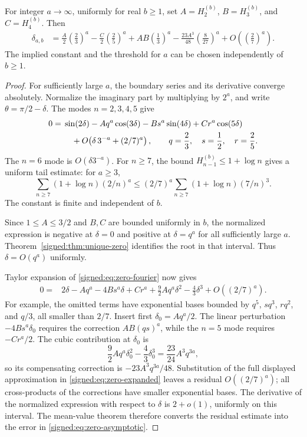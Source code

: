 \begin{theorem}\label{signed:thm:zero-asymptotic}
For integer $a\to\infty$, uniformly for real $b\ge1$, set
$A=H_2^{(b)}$, $B=H_3^{(b)}$, and $C=H_4^{(b)}$. Then
\begin{align}\label{signed:eq:zero-asymptotic}
 \delta_{a,b}
 &=\frac A2\left(\frac23\right)^a
   -\frac C2\left(\frac25\right)^a
   +AB\left(\frac13\right)^a
   -\frac{23A^3}{48}\left(\frac8{27}\right)^a
   +O\!\left(\left(\frac27\right)^a\right).
\end{align}
The implied constant and the threshold for $a$ can be chosen independently of $b\ge1$.
\end{theorem}
\begin{proof}
For sufficiently large $a$, the boundary series and its derivative converge absolutely. Normalize the imaginary part by multiplying by $2^a$, and write $\theta=\pi/2-\delta$. The modes $n=2,3,4,5$ give
\begin{align}\label{signed:eq:zero-fourier}
 0={}&\sin(2\delta)-Aq^a\cos(3\delta)-Bs^a\sin(4\delta)
       +Cr^a\cos(5\delta)\notag\\
    &\quad+O\!\left(\delta\,3^{-a}+(2/7)^a\right),
 \qquad q=\frac23,\quad s=\frac12,\quad r=\frac25.
\end{align}
The $n=6$ mode is $O(\delta3^{-a})$. For $n\ge7$, the bound
$H_{n-1}^{(b)}\le1+\log n$ gives a uniform tail estimate: for $a\ge3$,
\[
 \sum_{n\ge7}(1+\log n)(2/n)^a
 \le (2/7)^a\sum_{n\ge7}(1+\log n)(7/n)^3.
\]
The constant is finite and independent of $b$.

Since $1\le A\le3/2$ and $B,C$ are bounded uniformly in $b$, the normalized expression is negative at $\delta=0$ and positive at $\delta=q^a$ for all sufficiently large $a$. Theorem~\ref{signed:thm:unique-zero} identifies the root in that interval. Thus $\delta=O(q^a)$ uniformly.

Taylor expansion of \eqref{signed:eq:zero-fourier} now gives
\begin{align}\label{signed:eq:zero-expanded}
 0={}&2\delta-Aq^a-4Bs^a\delta+Cr^a
       +\frac92Aq^a\delta^2-\frac43\delta^3
       +O((2/7)^a).
\end{align}
For example, the omitted terms have exponential bases bounded by
$q^5$, $sq^3$, $rq^2$, and $q/3$, all smaller than $2/7$. Insert first
$\delta_0=Aq^a/2$. The linear perturbation $-4Bs^a\delta_0$ requires the correction $AB(qs)^a$, while the $n=5$ mode requires $-Cr^a/2$.
The cubic contribution at $\delta_0$ is
\[
 \frac92Aq^a\delta_0^2-\frac43\delta_0^3
 =\frac{23}{24}A^3q^{3a},
\]
so its compensating correction is $-23A^3q^{3a}/48$.
Substitution of the full displayed approximation in \eqref{signed:eq:zero-expanded} leaves a residual $O((2/7)^a)$; all cross-products of the corrections have smaller exponential bases. The derivative of the normalized expression with respect to $\delta$ is $2+o(1)$, uniformly on this interval. The mean-value theorem therefore converts the residual estimate into the error in \eqref{signed:eq:zero-asymptotic}.
\end{proof}

